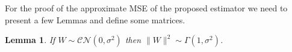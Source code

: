 \documentclass[journal,12pt,onecolumn]{IEEEtran}
\newtheorem{lemma}{Lemma}
\begin{document}
\appendices
\section{}

For the proof of the approximate MSE of the proposed estimator we need to present a few Lemmas and define some matrices.

\begin{lemma} If $W \sim \mathcal{CN}(0,\sigma^2)$ then $\lVert W \rVert^{2} \sim \Gamma(1,\sigma^2)$.
\end{lemma}



\end{document}
